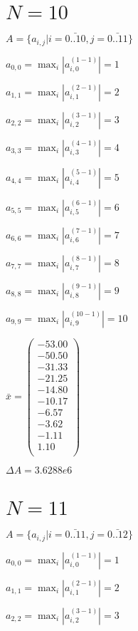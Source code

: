 \documentclass[a4paper,12pt]{article}
\begin{document}
\section{ $N = 10$ }
$A = \{ a _{ i, j } | i = \bar { 0..10 }, j = \bar { 0..11 } \}$

$a _{ 0, 0 } =  \max _i |a _{ i, 0 } ^{ (1 - 1) } | = 1$

$a _{ 1, 1 } =  \max _i |a _{ i, 1 } ^{ (2 - 1) } | = 2$

$a _{ 2, 2 } =  \max _i |a _{ i, 2 } ^{ (3 - 1) } | = 3$

$a _{ 3, 3 } =  \max _i |a _{ i, 3 } ^{ (4 - 1) } | = 4$

$a _{ 4, 4 } =  \max _i |a _{ i, 4 } ^{ (5 - 1) } | = 5$

$a _{ 5, 5 } =  \max _i |a _{ i, 5 } ^{ (6 - 1) } | = 6$

$a _{ 6, 6 } =  \max _i |a _{ i, 6 } ^{ (7 - 1) } | = 7$

$a _{ 7, 7 } =  \max _i |a _{ i, 7 } ^{ (8 - 1) } | = 8$

$a _{ 8, 8 } =  \max _i |a _{ i, 8 } ^{ (9 - 1) } | = 9$

$a _{ 9, 9 } =  \max _i |a _{ i, 9 } ^{ (10 - 1) } | = 10$

$\bar { x } = \begin{pmatrix}
-53.00 \\
-50.50 \\
-31.33 \\
-21.25 \\
-14.80 \\
-10.17 \\
-6.57 \\
-3.62 \\
-1.11 \\
1.10 \\
\end{pmatrix}
$

$\Delta A = 3.6288e6$



\section{ $N = 11$ }
$A = \{ a _{ i, j } | i = \bar { 0..11 }, j = \bar { 0..12 } \}$

$a _{ 0, 0 } =  \max _i |a _{ i, 0 } ^{ (1 - 1) } | = 1$

$a _{ 1, 1 } =  \max _i |a _{ i, 1 } ^{ (2 - 1) } | = 2$

$a _{ 2, 2 } =  \max _i |a _{ i, 2 } ^{ (3 - 1) } | = 3$
\end{document}
